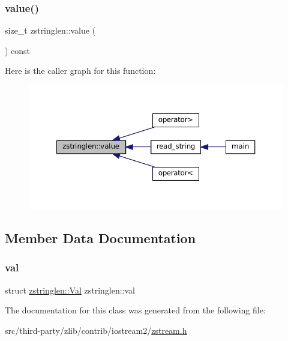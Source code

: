 \subsubsection{\texorpdfstring{value()}{value()}}
{\footnotesize\ttfamily size\+\_\+t zstringlen\+::value (\begin{DoxyParamCaption}{ }\end{DoxyParamCaption}) const\hspace{0.3cm}{\ttfamily [inline]}}

Here is the caller graph for this function\+:
\nopagebreak
\begin{figure}[H]
\begin{center}
\leavevmode
\includegraphics[width=350pt]{classzstringlen_a4027f6245694bc4ac5ca2f4719aa2982_icgraph}
\end{center}
\end{figure}


\subsection{Member Data Documentation}
\mbox{\label{classzstringlen_a15c3da1ffefe79eee45314c8380da81d}} 
\subsubsection{\texorpdfstring{val}{val}}
{\footnotesize\ttfamily struct \mbox{\hyperlink{classzstringlen_structzstringlen_1_1_val}{zstringlen\+::\+Val}}  zstringlen\+::val\hspace{0.3cm}{\ttfamily [private]}}



The documentation for this class was generated from the following file\+:\begin{DoxyCompactItemize}
\item 
src/third-\/party/zlib/contrib/iostream2/\mbox{\hyperlink{zstream_8h}{zstream.\+h}}\end{DoxyCompactItemize}
